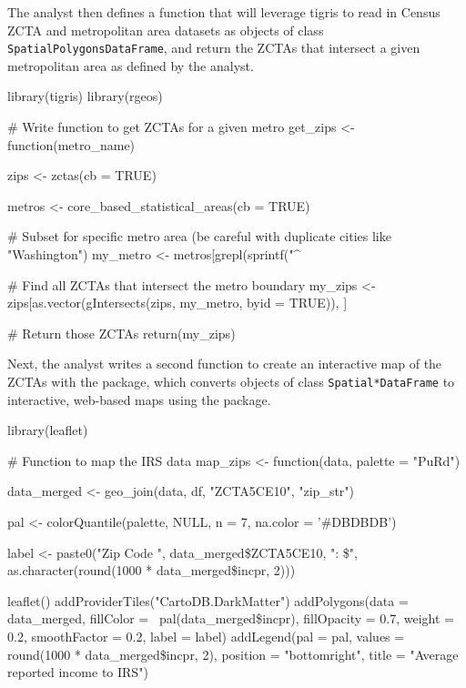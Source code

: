 The analyst then defines a function that will leverage tigris to read in
Census ZCTA and metropolitan area datasets as objects of class
\texttt{SpatialPolygonsDataFrame}, and return the ZCTAs that intersect a
given metropolitan area as defined by the analyst.

\begin{Schunk}
\begin{Sinput}
library(tigris)
library(rgeos)

# Write function to get ZCTAs for a given metro
get_zips <- function(metro_name) {
  
  zips <- zctas(cb = TRUE)
  
  metros <- core_based_statistical_areas(cb = TRUE)
  
  # Subset for specific metro area (be careful with duplicate cities like "Washington")
  my_metro <- metros[grepl(sprintf("\^%s", metro_name), metros\$NAME, ignore.case = TRUE), ]
  
  # Find all ZCTAs that intersect the metro boundary
  my_zips <- zips[as.vector(gIntersects(zips, my_metro, byid = TRUE)), ]
  
  # Return those ZCTAs
  return(my_zips)

}
\end{Sinput}
\end{Schunk}

Next, the analyst writes a second function to create an interactive map
of the ZCTAs with the  package, which converts objects
of class \texttt{Spatial*DataFrame} to interactive, web-based maps using
the  package.

\begin{Schunk}
\begin{Sinput}
library(leaflet)

# Function to map the IRS data
map_zips <- function(data, palette = "PuRd") {
  
  data_merged <- geo_join(data, df, "ZCTA5CE10", "zip_str")

  pal <- colorQuantile(palette, NULL, n = 7, na.color = '#DBDBDB')
  
  label <- paste0("Zip Code ", data_merged\$ZCTA5CE10, ": \$", as.character(round(1000 * data_merged\$incpr, 2)))
  
  leaflet() %>%
    addProviderTiles("CartoDB.DarkMatter") %>%
    addPolygons(data = data_merged, 
                fillColor = ~pal(data_merged\$incpr), 
                fillOpacity = 0.7, 
                weight = 0.2, 
                smoothFactor = 0.2, 
                label = label) %>%
    addLegend(pal = pal, 
              values = round(1000 * data_merged\$incpr, 2), 
              position = "bottomright", 
              title = "Average reported income to IRS")

}
\end{Sinput}
\end{Schunk}

